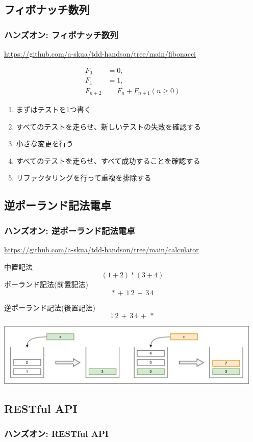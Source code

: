 \documentclass[aspectratio=169]{beamer}
\begin{document}
\subsection{フィボナッチ数列}
\begin{frame}\frametitle{ハンズオン: フィボナッチ数列}
  {\color{gray} \url{https://github.com/a-skua/tdd-handson/tree/main/fibonacci}}

  \begin{align*}
    F_0 &= 0, \\
    F_1 &= 1, \\
    F_{n+2} &= F_n + F_{n+1} (n \ge 0)
  \end{align*}

  \begin{enumerate}
    \item まずはテストを1つ書く
    \item すべてのテストを走らせ、新しいテストの失敗を確認する
    \item 小さな変更を行う
    \item すべてのテストを走らせ、すべて成功することを確認する
    \item リファクタリングを行って重複を排除する
  \end{enumerate}
\end{frame}

\subsection{逆ポーランド記法電卓}
\begin{frame}\frametitle{ハンズオン: 逆ポーランド記法電卓}
  {\color{gray} \url{https://github.com/a-skua/tdd-handson/tree/main/calculator}}

  中置記法
  \[ (1 + 2) * (3 + 4) \]
  ポーランド記法(前置記法)
  \[ *\, +\,1\,2\, +\,3\,4 \]

  逆ポーランド記法(後置記法)
  \[ 1\,2\,+\, 3\,4\,+\, * \]

  \includegraphics[height=3cm]{asset/stack.png}
\end{frame}

\subsection{RESTful API}
\begin{frame}\frametitle{ハンズオン: RESTful API}
\end{frame}
\end{document}
